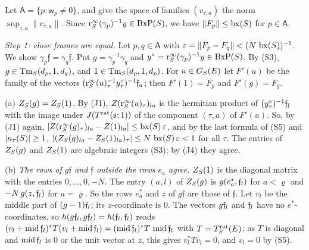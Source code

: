 \documentclass[11pt,a4paper]{article}
\makeatletter
\theoremstyle{plainx}
\theoremstyle{uprightx}
\renewenvironment{proof}[1][Proof]{\par\pushQED{\qed}\normalfont\topsep0pt\partopsep0pt
  \trivlist\item[\hskip\labelsep\itshape #1.]\ignorespaces}{\popQED\endtrivlist\@endpefalse}
\newcommand{\Mid}{\operatorname{mid}}
\newcommand{\sA}{\mathsf{A}}
\newcommand{\sw}{\mathsf{w}}
\makeatother
\begin{document}
\begin{proof}[Proof of Theorem B]
Let $\sA=\{p:\sw_p\ne0\}$, and give the space of families $(v_{\tau,a})$ the norm $\sup_{\tau,a}\|v_{\tau,a}\|$. Since
$\mathrm{r}^{\infty}_{S}(\gamma_p)^{-1}y\in\operatorname{BxP}(S)$, we have $\|F_p\|\le\operatorname{bx}(S)$ for $p\in\sA$.

\emph{Step 1: close frames are equal.} Let $p,q\in\sA$ with $\varepsilon=\|F_p-F_q\|<(N\,\operatorname{bx}(S))^{-1}$. We show
$\gamma_p\mathfrak f=\gamma_q\mathfrak f$. Put $g=\gamma_p^{-1}\gamma_q$ and $y^{\circ}=\mathrm{r}^{\infty}_{S}(\gamma_p)^{-1}y\in\operatorname{BxP}(S)$. By
(S3), $g\in\mathrm{Tm}_{S}(d_p,1,d_q)$, and $1\in\mathrm{Tm}_{S}(d_p,1,d_p)$. For $u\in G_{S}(E)$ let $F'(u)$ be the family
of the vectors $(\mathrm{r}^{\infty}_{S}(u)_\tau^{-1}y^{\circ}_\tau)^{-1}\mathfrak{f}_{a}$; then $F'(1)=F_p$ and $F'(g)=F_q$.

(a) $Z_{S}(g)=Z_{S}(1)$. By (J1), $Z(\mathrm{r}^{\infty}_{S}(u)_\tau)_{la}$ is the hermitian product of
$(y^{\circ}_\tau)^{-1}\mathfrak{f}_{l}$ with the image under $J(T^{\mathrm{rat}}(\mathfrak{s};1))$ of the component $(\tau,a)$ of $F'(u)$. So, by (J1) again,
$|Z(\mathrm{r}^{\infty}_{S}(g)_\tau)_{la}-Z(1)_{la}|\le\operatorname{bx}(S)\,\varepsilon$, and by the last formula of (S5) and $|\kappa_{\tau}(S)|\ge1$,
$|(Z_{S}(g)_{la}-Z_{S}(1)_{la})_\tau|\le N\,\operatorname{bx}(S)\,\varepsilon<1$ for all $\tau$. The entries of $Z_{S}(g)$ and
$Z_{S}(1)$ are algebraic integers (S3); by (J4) they agree.

(b) \emph{The rows of $g\mathfrak f$ and $\mathfrak f$ outside the rows $e_a$ agree.} $Z_{S}(1)$ is the diagonal matrix
with the entries $0,\dots,0,-N$. The entry $(a,l)$ of $Z_{S}(g)$ is $g(e^*_a,\mathfrak{f}_{l})$ for $a<\varrho$ and
$-N\,g(z,\mathfrak{f}_{l})$ for $a=\varrho$. So the rows $e^*_a$ and $z$ of $g\mathfrak f$ are those of $\mathfrak f$. Let $v_l$ be the
middle part of $(g-1)\mathfrak{f}_{l}$; its $z$-coordinate is $0$. The vectors $g\mathfrak{f}_{l}$ and $\mathfrak{f}_{l}$ have no
$e^*$-coordinates, so $h(g\mathfrak{f}_{l},g\mathfrak{f}_{l})=h(\mathfrak{f}_{l},\mathfrak{f}_{l})$ reads
$(v_l+\Mid\fr{l})^{*}T(v_l+\Mid\fr{l})=(\Mid\fr{l})^{*}T\,\Mid\fr{l}$ with $T=T^{\mathrm{rat}}_{S}(E)$; as $T$ is diagonal and
$\Mid\fr{l}$ is $0$ or the unit vector at $z$, this gives $v_l^{*}Tv_l=0$, and $v_l=0$ by (S5).


\end{proof}
\end{document}
